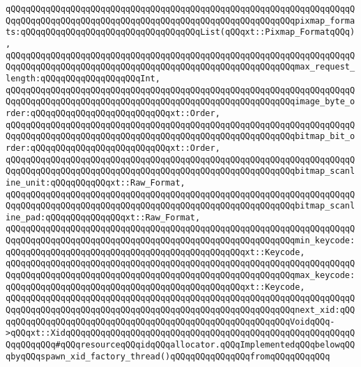 \newline
\verb|qQQqqQQqqQQqqQQqqQQqqQQqqQQqqQQqqQQqqQQqqQQqqQQqqQQqqQQqqQQqqQQqqQQqqQQqqQQqqQQqqQQqqQQqqQQqqQQqqQQqqQQqqQQqqQQqqQQqqQQqqQQqqQQqpixmap_formats:qQQqqQQqqQQqqQQqqQQqqQQqqQQqqQQqqQQqList(qQQqxt::Pixmap_FormatqQQq),|\newline
\verb|qQQqqQQqqQQqqQQqqQQqqQQqqQQqqQQqqQQqqQQqqQQqqQQqqQQqqQQqqQQqqQQqqQQqqQQqqQQqqQQqqQQqqQQqqQQqqQQqqQQqqQQqqQQqqQQqqQQqqQQqqQQqqQQqmax_request_length:qQQqqQQqqQQqqQQqqQQqInt,|\newline
\newline
\verb|qQQqqQQqqQQqqQQqqQQqqQQqqQQqqQQqqQQqqQQqqQQqqQQqqQQqqQQqqQQqqQQqqQQqqQQqqQQqqQQqqQQqqQQqqQQqqQQqqQQqqQQqqQQqqQQqqQQqqQQqqQQqqQQqimage_byte_order:qQQqqQQqqQQqqQQqqQQqqQQqqQQqxt::Order,|\newline
\verb|qQQqqQQqqQQqqQQqqQQqqQQqqQQqqQQqqQQqqQQqqQQqqQQqqQQqqQQqqQQqqQQqqQQqqQQqqQQqqQQqqQQqqQQqqQQqqQQqqQQqqQQqqQQqqQQqqQQqqQQqqQQqqQQqbitmap_bit_order:qQQqqQQqqQQqqQQqqQQqqQQqqQQqxt::Order,|\newline
\newline
\verb|qQQqqQQqqQQqqQQqqQQqqQQqqQQqqQQqqQQqqQQqqQQqqQQqqQQqqQQqqQQqqQQqqQQqqQQqqQQqqQQqqQQqqQQqqQQqqQQqqQQqqQQqqQQqqQQqqQQqqQQqqQQqqQQqbitmap_scanline_unit:qQQqqQQqqQQqxt::Raw_Format,|\newline
\verb|qQQqqQQqqQQqqQQqqQQqqQQqqQQqqQQqqQQqqQQqqQQqqQQqqQQqqQQqqQQqqQQqqQQqqQQqqQQqqQQqqQQqqQQqqQQqqQQqqQQqqQQqqQQqqQQqqQQqqQQqqQQqqQQqbitmap_scanline_pad:qQQqqQQqqQQqqQQqxt::Raw_Format,|\newline
\newline
\verb|qQQqqQQqqQQqqQQqqQQqqQQqqQQqqQQqqQQqqQQqqQQqqQQqqQQqqQQqqQQqqQQqqQQqqQQqqQQqqQQqqQQqqQQqqQQqqQQqqQQqqQQqqQQqqQQqqQQqqQQqqQQqqQQqmin_keycode:qQQqqQQqqQQqqQQqqQQqqQQqqQQqqQQqqQQqqQQqqQQqqQQqxt::Keycode,|\newline
\verb|qQQqqQQqqQQqqQQqqQQqqQQqqQQqqQQqqQQqqQQqqQQqqQQqqQQqqQQqqQQqqQQqqQQqqQQqqQQqqQQqqQQqqQQqqQQqqQQqqQQqqQQqqQQqqQQqqQQqqQQqqQQqqQQqmax_keycode:qQQqqQQqqQQqqQQqqQQqqQQqqQQqqQQqqQQqqQQqqQQqqQQqxt::Keycode,|\newline
\newline
\verb|qQQqqQQqqQQqqQQqqQQqqQQqqQQqqQQqqQQqqQQqqQQqqQQqqQQqqQQqqQQqqQQqqQQqqQQqqQQqqQQqqQQqqQQqqQQqqQQqqQQqqQQqqQQqqQQqqQQqqQQqqQQqqQQqnext_xid:qQQqqQQqqQQqqQQqqQQqqQQqqQQqqQQqqQQqqQQqqQQqqQQqqQQqqQQqqQQqVoidqQQq->qQQqxt::XidqQQqqQQqqQQqqQQqqQQqqQQqqQQqqQQqqQQqqQQqqQQqqQQqqQQqqQQqqQQqqQQqqQQq#qQQqresourceqQQqidqQQqallocator.qQQqImplementedqQQqbelowqQQqbyqQQqspawn_xid_factory_thread()qQQqqQQqqQQqqQQqfromqQQqqQQqqQQq|\newline
